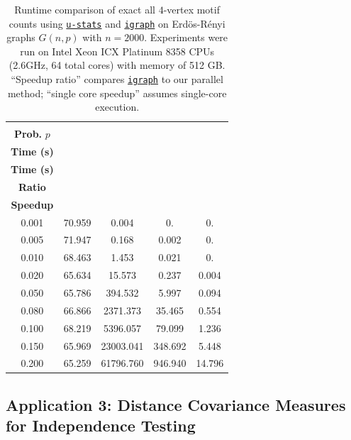 \documentclass[letterpaper,11pt]{article}
\newcommand{\libref}[2]{\href{#2}{\texttt{#1}}}
\def\package{\libref{u-stats}{https://github.com/zrq1706/U-Statistics-Python}}
\def\igraph{\libref{igraph}{https://igraph.org/}}
\begin{document}
\begin{bibunit}[plainnat]
\begin{table}[h!]
\centering
\caption{
Runtime comparison of exact all $4$-vertex motif counts using \package{} and \igraph{} on Erd\"{o}s-R\'{e}nyi graphs $G(n, p)$ with $n = 2000$. 
Experiments were run on Intel Xeon ICX Platinum 8358 CPUs (2.6GHz, 64 total cores) with memory of 512 GB.
“Speedup ratio” compares \igraph{} to our parallel method; “single core speedup” assumes single-core execution.
}
\label{tab:motif_counts_4}
\begin{tabular}{ccccc}
\toprule
\makecell{\textbf{Edge} \\ \textbf{Prob.} $p$} & \makecell{\textbf{\package{}} \\ \textbf{Time (s)}} & \makecell{\textbf{\igraph{}} \\ \textbf{Time (s)}} &\makecell{\textbf{Speedup} \\ \textbf{Ratio}} &  \makecell{\textbf{Single-Core} \\ \textbf{Speedup}} \\
\midrule
0.001 & 70.959 & 0.004 & 0. & 0. \\
0.005 & 71.947 & 0.168 & 0.002 & 0. \\
0.010 & 68.463 & 1.453 & 0.021 & 0. \\
0.020 & 65.634 & 15.573 & 0.237 & 0.004 \\
0.050 & 65.786 & 394.532 & 5.997 & 0.094 \\
0.080 & 66.866 & 2371.373 & 35.465 & 0.554 \\
0.100 & 68.219 & 5396.057 & 79.099 & 1.236 \\
0.150 & 65.969 & 23003.041 & 348.692 & 5.448 \\
0.200 & 65.259 & 61796.760 & 946.940 & 14.796 \\
\bottomrule
\end{tabular}
\end{table}

\subsection{Application 3: Distance Covariance Measures for Independence Testing}
\label{sec:dependence}


\end{bibunit}
\end{document}
